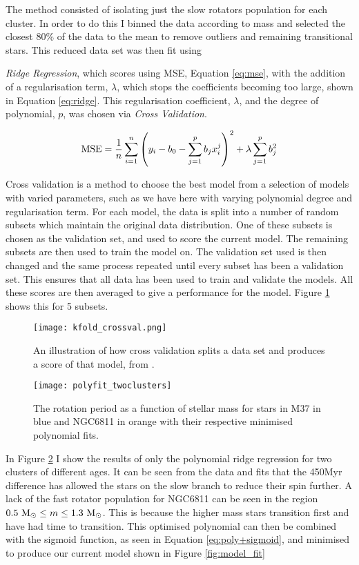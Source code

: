\documentclass[fleqn,usenatbib]{mnras}
\begin{document}
The method consisted of isolating just the slow rotators population for each cluster.
In order to do this I binned the data according to mass and selected the closest 80\% of the data to the mean to remove outliers and remaining transitional stars.
This reduced data set was then fit using {\textit{Ridge Regression}, which scores using MSE, Equation \ref{eq:mse}, with the addition of a regularisation term, $\lambda$, which stops the coefficients becoming too large, shown in Equation \ref{eq:ridge}.
This regularisation coefficient, $\lambda$, and the degree of polynomial, $p$, was chosen via \textit{Cross Validation}.

\begin{equation}
	\label{eq:ridge}
	\textup{MSE} = \frac{1}{n}\sum_{i = 1}^n \left(y_i - b_0 - \sum_{j = 1}^p b_jx_i^j \right)^2 + \lambda \sum_{j = 1}^p b^2_j
\end{equation}

Cross validation is a method to choose the best model from a selection of models with varied parameters, such as we have here with varying polynomial degree and regularisation term.
For each model, the data is split into a number of random subsets which maintain the original data distribution.
One of these subsets is chosen as the validation set, and used to score the current model.
The remaining subsets are then used to train the model on.
The validation set used is then changed and the same process repeated until every subset has been a validation set.
This ensures that all data has been used to train and validate the models.
All these scores are then averaged to give a performance for the model.
Figure \ref{fig:cross_validation} shows this for 5 subsets.

\begin{figure}
	\texttt{[image: kfold\_crossval.png]}
	\caption{An illustration of how cross validation splits a data set and produces a score of that model, from \protect\cite{CrossVal}.}
	\label{fig:cross_validation}
\end{figure}



\begin{figure}
	\texttt{[image: polyfit\_twoclusters]}
	\caption{The rotation period as a function of stellar mass for stars in M37 in blue and NGC6811 in orange with their respective minimised polynomial fits.}
	\label{fig:polyfit_twoclusters}
\end{figure}

In Figure \ref{fig:polyfit_twoclusters} I show the results of only the polynomial ridge regression for two clusters of different ages.
It can be seen from the data and fits that the 450Myr difference has allowed the stars on the slow branch to reduce their spin further.
A lack of the fast rotator population for NGC6811 can be seen in the region $0.5~\textup{M}_\odot \leq m \leq 1.3~\textup{M}_\odot$.
This is because the higher mass stars transition first and have had time to transition.
This optimised polynomial can then be combined with the sigmoid function, as seen in Equation \ref{eq:poly+sigmoid}, and minimised to produce our current model shown in Figure \ref{fig:model_fit}

}
\end{document}
